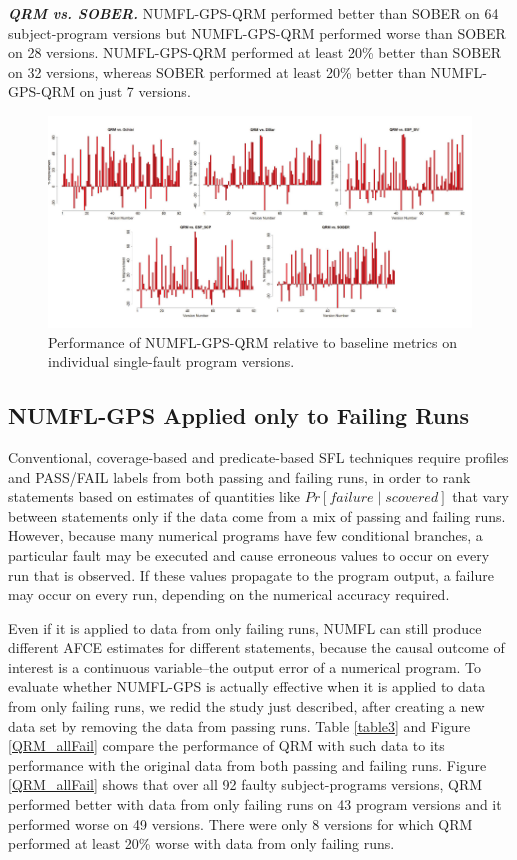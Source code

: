 \textit{\textbf{ QRM vs. SOBER.}}  NUMFL-GPS-QRM performed better than SOBER on 64 subject-program versions but NUMFL-GPS-QRM performed worse than SOBER on 28 versions.  NUMFL-GPS-QRM performed at least 20\% better than SOBER on 32 versions, whereas SOBER performed at least 20\% better than NUMFL-GPS-QRM on just 7 versions.

\begin{figure}
\centering
\includegraphics[width=\textwidth]{chapter3_QRM_VS_Base.pdf}
\caption{Performance of NUMFL-GPS-QRM relative to baseline metrics on individual single-fault program versions.}
\label{QRM_VS_Base}
\end{figure}

\subsection{NUMFL-GPS Applied only to Failing Runs}\label{VE}
Conventional, coverage-based and predicate-based SFL techniques require profiles and PASS/FAIL labels from both passing and failing runs, in order to rank statements based on estimates of quantities like $Pr [failure \mid s covered]$ \cite{Baah2010} that vary between statements only if the data come from a mix of passing and failing runs.  However, because many numerical programs have few conditional branches, a particular fault may be executed and cause erroneous values to occur on every run that is observed.  If these values propagate to the program output, a failure may occur on every run, depending on the numerical accuracy required.


Even if it is applied to data from only failing runs, NUMFL can still produce different AFCE estimates for different statements, because the causal outcome of interest is a continuous variable--the output error of a numerical program.  To evaluate whether NUMFL-GPS is actually effective when it is applied to data from only failing runs, we redid the study just described, after creating a new data set by removing the data from passing runs.  Table \ref{table3} and Figure \ref{QRM_allFail} compare the performance of QRM with such data to its performance with the original data from both passing and failing runs.  Figure \ref{QRM_allFail} shows that over all 92 faulty subject-programs versions, QRM performed better with data from only failing runs on 43 program versions and it performed worse on 49 versions.  There were only 8 versions for which QRM performed at least 20\% worse with data from only failing runs.

